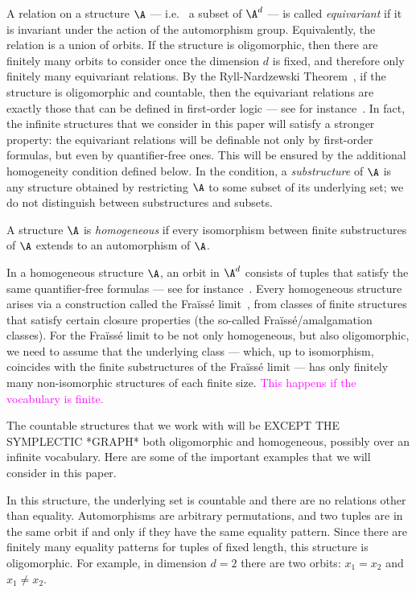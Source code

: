A relation on a structure $\A$ --- i.e.~ a subset of $\A^d$ --- is called \emph{equivariant} if it is invariant under the action of the automorphism group. 
Equivalently, the relation is a union of orbits. 
If the structure is oligomorphic, then there are finitely many orbits to consider once the dimension $d$ is fixed, 
and therefore  only finitely many equivariant relations. 
By the Ryll-Nardzewski Theorem~\cite[Thm.~7.3.1]{hodges1993model}, if the structure is oligomorphic and countable, 
then the equivariant relations are exactly those that can be defined in first-order logic 
--- see for instance~\cite[Lem.~5.9]{bojanczyk_slightly}. 
In fact, the infinite structures that we consider in this paper will satisfy a stronger property: 
the equivariant relations will be definable not only by first-order formulas, but even by quantifier-free ones. 
This will be ensured by the additional homogeneity condition defined below. 
In the condition, a \emph{substructure} of $\A$ is any structure obtained by restricting $\A$ to some subset  of its underlying set; 
we do not distinguish between substructures and subsets.

\begin{definition}
     A structure $\A$ is \emph{homogeneous} if every isomorphism between finite substructures of $\A$ extends to an automorphism of $\A$.
\end{definition}

In a homogeneous structure $\A$, an orbit in $\A^d$ consists of tuples that satisfy the same quantifier-free formulas --- see for instance~\cite[Thm.~6.3]{bojanczyk_slightly}. 
Every homogeneous structure arises via a construction called the Fraïssé limit~\cite[Sec.~7.4]{hodges1993model}, from classes of finite structures that satisfy certain closure properties (the so-called Fraïssé/amalgamation classes). 
For the Fraïssé limit to be not only homogeneous, but also oligomorphic, we need to assume that the underlying class --- which, up to isomorphism, coincides with the finite substructures of the Fraïssé limit --- has only finitely many non-isomorphic structures of each finite size. 
\textcolor{magenta}{This happens if the vocabulary is finite.}

The countable structures that we work with will be EXCEPT THE SYMPLECTIC *GRAPH* both oligomorphic and homogeneous, possibly over an infinite vocabulary. 
Here are some of the important examples that we will consider in this paper.

\begin{example} \label{ex:equality-atoms} In this structure, the underlying set is countable and there are no relations other than equality.  Automorphisms are arbitrary permutations, and two tuples are in the same orbit if and only if they have the same equality pattern. Since there are finitely many equality patterns for tuples of fixed length, this structure is oligomorphic. For example, in dimension $d=2$ there are two orbits: $x_1=x_2$ and $x_1 \neq x_2$.
\lipicsEnd\end{example}

